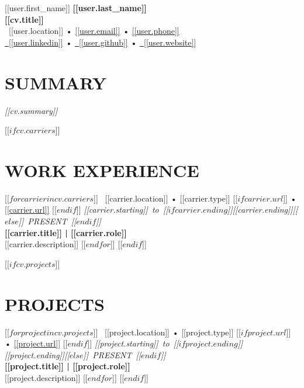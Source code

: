 \documentclass[10pt, letterpaper]{article}
\newcommand{\location}[1]{\mbox{\color{secondary_text}\faMapMarker* \ #1}}
\newcommand{\type}[1]{{\small{\color{primaryblue}#1}}}
\newcommand{\dates}[1]{\hfill\mbox{\textit{\small{\color{primaryblue}#1}}}}
\newcommand{\titlerole}[1]{\textbf{\small{#1}}}
\begin{document}
    \begin{center}
        {\Huge{[[user.first_name]]}} {\Huge\textbf{[[user.last_name]]}}\\
        {\large\textbf{[[cv.title]]}}\\
        \vspace{0.5cm}
        \location{[[user.location]]} \textcolor{secondary_text}{•} \href{mailto:[[user.email]]}{[[user.email]]} \textcolor{secondary_text}{•} \href{tel:[[user.phone]]}{[[user.phone]]}\\
        \href{https://[[user.linkedin]]}{\faLinkedin \ [[user.linkedin]]} \textcolor{secondary_text}{•} \href{https://[[user.github]]}{\faGithub \ [[user.github]]} \textcolor{secondary_text}{•} \href{https://[[user.website]]}{\faGlobe \ [[user.website]]} \\
    \end{center}
    \vspace{0.5cm}

    \section{SUMMARY}
    \textit{[[cv.summary]]}

    [[$ if cv.carriers $]]
        \section{WORK EXPERIENCE}
        [[$ for carrier in cv.carriers $]]
            \location{[[carrier.location]]} \textcolor{secondary_text}{•} \type{[[carrier.type]]} [[$ if carrier.url $]] \textcolor{secondary_text}{•} \href{https://[[carrier.url]]}{[[carrier.url]]} [[$ endif $]] \dates{[[carrier.starting]] to [[$ if carrier.ending $]][[carrier.ending]][[$ else $]] PRESENT [[$ endif $]]}  \\
            \titlerole{[[carrier.title]] | [[carrier.role]]} \\
            \small{[[carrier.description]]}
            \vspace{0.2cm}
        [[$ endfor $]]
    [[$ endif $]]

    [[$ if cv.projects $]]
        \section{PROJECTS}
        [[$ for project in cv.projects $]]
            \location{[[project.location]]} \textcolor{secondary_text}{•} \type{[[project.type]]} [[$ if project.url $]] \textcolor{secondary_text}{•} \href{https://[[project.url]]}{[[project.url]]} [[$ endif $]] \dates{[[project.starting]] to [[$ if project.ending $]][[project.ending]][[$ else $]] PRESENT [[$ endif $]]} \\
            \titlerole{[[project.title]] | [[project.role]]} \\
            \small{[[project.description]]}
            \vspace{0.2cm}
        [[$ endfor $]]
    [[$ endif $]]
\end{document}
